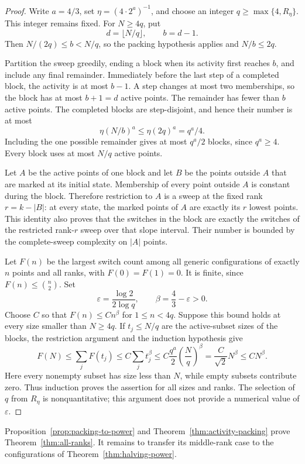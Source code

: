 \begin{proof}
Write $a=4/3$, set $\eta=(4\cdot2^a)^{-1}$, and choose an integer
$q\ge\max\{4,R_\eta\}$. This integer remains fixed. For $N\ge4q$,
put
\[
 d=\lfloor N/q\rfloor,\qquad b=d-1.
\]
Then $N/(2q)\le b<N/q$, so the packing hypothesis applies and
$N/b\le2q$.

Partition the sweep greedily, ending a block when its activity first
reaches $b$, and include any final remainder. Immediately before the
last step of a completed block, the activity is at most $b-1$.
A step changes at most two memberships, so the block has at most
$b+1=d$ active points. The remainder has fewer than $b$ active points.
The completed blocks are step-disjoint, and hence their number is at
most
\[
 \eta(N/b)^a\le\eta(2q)^a=q^a/4.
\]
Including the one possible remainder gives at most $q^a/2$ blocks,
since $q^a\ge4$. Every block uses at most $N/q$ active points.

Let $A$ be the active points of one block and let $B$ be the points
outside $A$ that are marked at its initial state. Membership of every
point outside $A$ is constant during the block. Therefore restriction
to $A$ is a sweep at the fixed rank $r=k-|B|$: at every state, the
marked points of $A$ are exactly its $r$ lowest points. This identity
also proves that the switches in the block are exactly the switches
of the restricted rank-$r$ sweep over that slope interval. Their
number is bounded by the complete-sweep complexity on $|A|$ points.

Let $F(n)$ be the largest switch count among all generic configurations
of exactly $n$ points and all ranks, with $F(0)=F(1)=0$. It is finite,
since $F(n)\le\binom n2$. Set
\[
 \varepsilon=\frac{\log2}{2\log q},\qquad
 \beta=\frac43-\varepsilon>0.
\]
Choose $C$ so that $F(n)\le Cn^\beta$ for $1\le n<4q$. Suppose this
bound holds at every size smaller than $N\ge4q$. If $t_j\le N/q$
are the active-subset sizes of the blocks, the restriction argument
and the induction hypothesis give
\[
 F(N)\le\sum_j F(t_j)
 \le C\sum_j t_j^\beta
 \le C\frac{q^a}{2}\left(\frac Nq\right)^\beta
 =\frac{C}{\sqrt2}N^\beta
 \le CN^\beta.
\]
Here every nonempty subset has size less than $N$, while empty subsets
contribute zero. Thus induction proves the assertion for all sizes
and ranks. The selection of $q$ from $R_\eta$ is nonquantitative;
this argument does not provide a numerical value of $\varepsilon$.
\end{proof}

Proposition~\ref{prop:packing-to-power} and Theorem~\ref{thm:activity-packing}
prove Theorem~\ref{thm:all-ranks}. It remains to transfer its middle-rank
case to the configurations of Theorem~\ref{thm:halving-power}.

